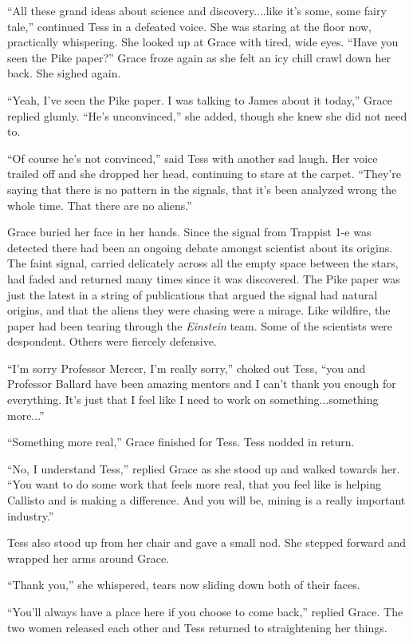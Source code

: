 \documentclass[openany, 12pt]{book} %
\begin{document}
``All these grand ideas about science and discovery....like it's some, some fairy tale,'' continued Tess in a defeated voice. She was staring at the floor now, practically whispering. She looked up at Grace with tired, wide eyes. ``Have you seen the Pike paper?'' Grace froze again as she felt an icy chill crawl down her back. She sighed again.

``Yeah, I've seen the Pike paper. I was talking to James about it today,'' Grace replied glumly. ``He's unconvinced,'' she added, though she knew she did not need to.

``Of course he's not convinced,'' said Tess with another sad laugh. Her voice trailed off and she dropped her head, continuing to stare at the carpet. ``They're saying that there is no pattern in the signals, that it's been analyzed wrong the whole time. That there are no aliens.'' 

Grace buried her face in her hands. Since the signal from Trappist 1-e was detected there had been an ongoing debate amongst scientist about its origins. The faint signal, carried delicately across all the empty space between the stars, had faded and returned many times since it was discovered. The Pike paper was just the latest in a string of publications that argued the signal had natural origins, and that the aliens they were chasing were a mirage. Like wildfire, the paper had been tearing through the \textit{Einstein} team. Some of the scientists were despondent. Others were fiercely defensive.

``I'm sorry Professor Mercer, I'm really sorry,'' choked out Tess, ``you and Professor Ballard have been amazing mentors and I can't thank you enough for everything. It's just that I feel like I need to work on something...something more...''

``Something more real,'' Grace finished for Tess. Tess nodded in return.

``No, I understand Tess,'' replied Grace as she stood up and walked towards her. ``You want to do some work that feels more real, that you feel like is helping Callisto and is making a difference. And you will be, mining is a really important industry.''

Tess also stood up from her chair and gave a small nod. She stepped forward and wrapped her arms around Grace.

``Thank you,'' she whispered, tears now sliding down both of their faces.

``You'll always have a place here if you choose to come back,'' replied Grace. The two women released each other and Tess returned to straightening her things. 
\end{document}
